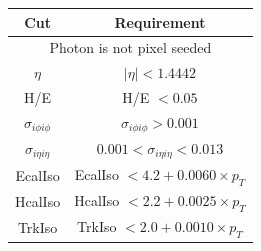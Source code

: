 \begin{table}[!ht]
\begin{center}
\begin{tabular}{|c|c|} 
\hline
Cut           & Requirement                                                                           \\
\hline
\multicolumn{2}{|c|}{Photon is not pixel seeded}                                                      \\
\hline
$\eta$        & $|\eta| < 1.4442$                                                                     \\ 
\hline
H/E           & H/E $< 0.05$                                                                          \\
$\sigma_{i\phi i\phi}$ & $\sigma_{i\phi i\phi} > 0.001$                                           \\
$\sigma_{i\eta i\eta}$ & $0.001 < \sigma_{i\eta i\eta} < 0.013$                                   \\
\hline
EcalIso       & EcalIso $<  4.2 + 0.0060\times p_{T}$   \\
HcalIso       & HcalIso $<  2.2 + 0.0025\times p_{T}$  \\
TrkIso        & TrkIso  $<  2.0 + 0.0010\times p_{T}$     \\
\hline


\end{tabular}
\end{center}
\end{table}
